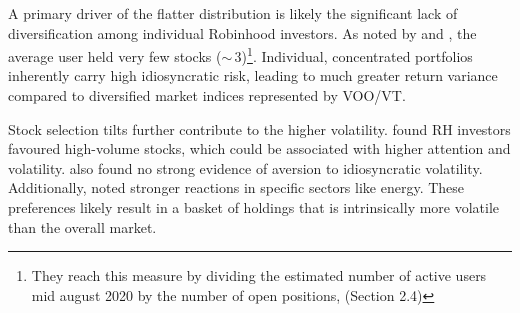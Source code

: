     
A primary driver of the flatter distribution is likely the significant lack of diversification among individual Robinhood investors. As noted by \cite{Fedyk2024} and \cite{Welch2022}, the average user held very few stocks ($\sim\,3$)\footnote{They reach this measure by dividing the estimated number of active users mid august 2020 by the number of open positions, (Section 2.4)}. 
Individual, concentrated portfolios inherently carry high idiosyncratic risk, leading to much greater return variance compared to diversified market indices represented by VOO/VT.
    
Stock selection tilts further contribute to the higher volatility. \cite{Welch2022} found RH investors favoured high-volume stocks, which could be associated with higher attention and volatility. 
\cite{Fedyk2024} also found no strong evidence of aversion to idiosyncratic volatility. Additionally, \cite{Ardia2023Fast} noted stronger reactions in specific sectors like energy. These preferences likely result in a basket of holdings that is intrinsically more volatile than the overall market.

